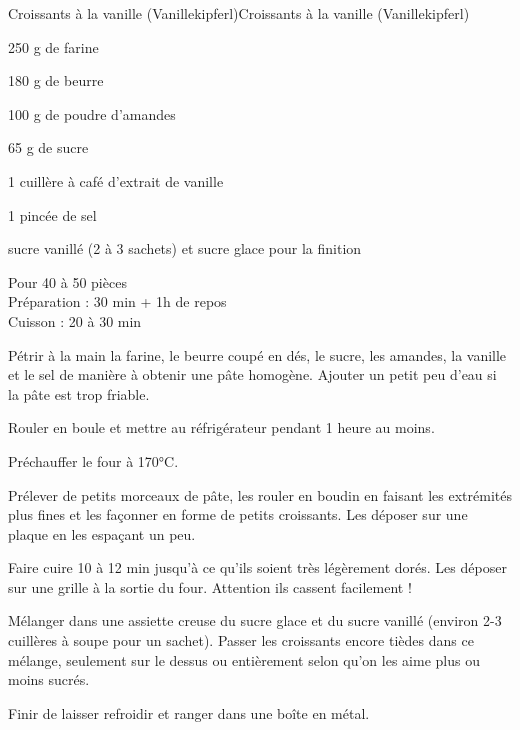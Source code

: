 \begin{recette}{Croissants à la vanille (Vanillekipferl)}{Croissants à la vanille (Vanillekipferl)}

\begin{ingredients}
250 g de farine\par
180 g de beurre\par
100 g de poudre d'amandes\par
65 g de sucre\par
1 cuillère à café d'extrait de vanille\par
1 pincée de sel\par
sucre vanillé (2 à 3 sachets) et sucre glace pour la finition\par
\end{ingredients}

\begin{infos}
Pour 40 à 50 pièces\\
Préparation : 30 min + 1h de repos\\
Cuisson : 20 à 30 min	\\
\end{infos}

\begin{etapes}
\item Pétrir à la main la farine, le beurre coupé en dés, le sucre, les amandes, la vanille et le sel de manière à obtenir une pâte homogène. Ajouter un petit peu d'eau si la pâte est trop friable.
\item Rouler en boule et mettre au réfrigérateur pendant 1 heure au moins.
\item Préchauffer le four à 170°C.
\item Prélever de petits morceaux de pâte, les rouler en boudin en faisant les extrémités plus fines et les façonner en forme de petits croissants. Les déposer sur une plaque en les espaçant un peu.
\item Faire cuire 10 à 12 min jusqu'à ce qu'ils soient très légèrement dorés. Les déposer sur une grille à la sortie du four. Attention ils cassent facilement !
\item Mélanger dans une assiette creuse du sucre glace et du sucre vanillé (environ 2-3 cuillères à soupe pour un sachet). Passer les croissants encore tièdes dans ce mélange, seulement sur le dessus ou entièrement selon qu'on les aime plus ou moins sucrés.
\item Finir de laisser refroidir et ranger dans une boîte en métal.
\end{etapes}

\end{recette}